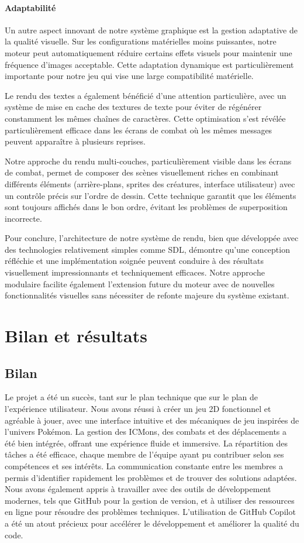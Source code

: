 \documentclass[12pt,a4paper, twoside]{article}
\begin{document}
\paragraph{Adaptabilité} Un autre aspect innovant de notre système graphique est la gestion adaptative de la qualité visuelle. Sur les configurations matérielles moins puissantes, notre moteur peut automatiquement réduire certains effets visuels pour maintenir une fréquence d'images acceptable. Cette adaptation dynamique est particulièrement importante pour notre jeu qui vise une large compatibilité matérielle.

Le rendu des textes a également bénéficié d'une attention particulière, avec un système de mise en cache des textures de texte pour éviter de régénérer constamment les mêmes chaînes de caractères. Cette optimisation s'est révélée particulièrement efficace dans les écrans de combat où les mêmes messages peuvent apparaître à plusieurs reprises.

Notre approche du rendu multi-couches, particulièrement visible dans les écrans de combat, permet de composer des scènes visuellement riches en combinant différents éléments (arrière-plans, sprites des créatures, interface utilisateur) avec un contrôle précis sur l'ordre de dessin. Cette technique garantit que les éléments sont toujours affichés dans le bon ordre, évitant les problèmes de superposition incorrecte.

Pour conclure, l'architecture de notre système de rendu, bien que développée avec des technologies relativement simples comme SDL, démontre qu'une conception réfléchie et une implémentation soignée peuvent conduire à des résultats visuellement impressionnants et techniquement efficaces. Notre approche modulaire facilite également l'extension future du moteur avec de nouvelles fonctionnalités visuelles sans nécessiter de refonte majeure du système existant.
\newpage
\section{Bilan et résultats}

\subsection{Bilan}
Le projet a été un succès, tant sur le plan technique que sur le plan de l'expérience utilisateur. Nous avons réussi à créer un jeu 2D fonctionnel et agréable à jouer, avec une interface intuitive et des mécaniques de jeu inspirées de l'univers Pokémon. La gestion des ICMons, des combats et des déplacements a été bien intégrée, offrant une expérience fluide et immersive.
La répartition des tâches a été efficace, chaque membre de l'équipe ayant pu contribuer selon ses compétences et ses intérêts. La communication constante entre les membres a permis d'identifier rapidement les problèmes et de trouver des solutions adaptées.
Nous avons également appris à travailler avec des outils de développement modernes, tels que GitHub pour la gestion de version, et à utiliser des ressources en ligne pour résoudre des problèmes techniques. L'utilisation de GitHub Copilot a été un atout précieux pour accélérer le développement et améliorer la qualité du code.
\end{document}
